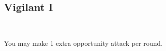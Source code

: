 \subsection*{Vigilant I}\label{feat:vigilant1}
 \\

You may make 1 extra opportunity attack per round.
